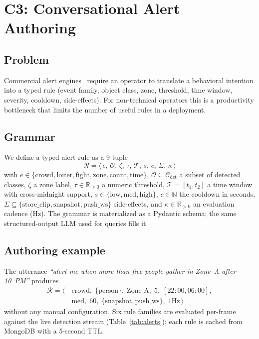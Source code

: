 ﻿\documentclass[conference]{IEEEtran}
\theoremstyle{definition}
\begin{document}
\section{C3: Conversational Alert Authoring}\label{sec:alert_grammar}

\subsection{Problem}
Commercial alert engines~\cite{b7,b8,b12} require an operator to translate a behavioral intention into a typed rule (event family, object class, zone, threshold, time window, severity, cooldown, side-effects). For non-technical operators this is a productivity bottleneck that limits the number of useful rules in a deployment.

\subsection{Grammar}
We define a typed alert rule as a 9-tuple
\[
\mathcal{R} = \langle\, e,\, \mathcal{O},\, \zeta,\, \tau,\, \mathcal{T},\, s,\, c,\, \Sigma,\, \kappa\,\rangle
\]
with $e\in\{\text{crowd}, \text{loiter}, \text{fight}, \text{zone}, \text{count}, \text{time}\}$, $\mathcal{O}\subseteq\mathcal{C}_{\text{det}}$ a subset of detected classes, $\zeta$ a zone label, $\tau\in\mathbb{R}_{\ge 0}$ a numeric threshold, $\mathcal{T}=[t_1,t_2]$ a time window with cross-midnight support, $s\in\{\text{low}, \text{med}, \text{high}\}$, $c\in\mathbb{N}$ the cooldown in seconds, $\Sigma\subseteq\{\text{store\_clip}, \text{snapshot}, \text{push\_ws}\}$ side-effects, and $\kappa\in\mathbb{R}_{>0}$ an evaluation cadence (Hz). The grammar is materialized as a Pydantic schema; the same structured-output LLM used for queries fills it.

\subsection{Authoring example}
The utterance \textit{``alert me when more than five people gather in Zone~A after 10~PM''} produces
\begin{align*}
\mathcal{R} = \langle\,&\text{crowd},\;\{\text{person}\},\;\text{Zone~A},\;5,\;[22{:}00,06{:}00],\\
&\text{med},\;60,\;\{\text{snapshot}, \text{push\_ws}\},\;\text{1Hz}\,\rangle
\end{align*}
without any manual configuration. Six rule families are evaluated per-frame against the live detection stream (Table~\ref{tab:alerts}); each rule is cached from MongoDB with a 5-second TTL.
\end{document}
